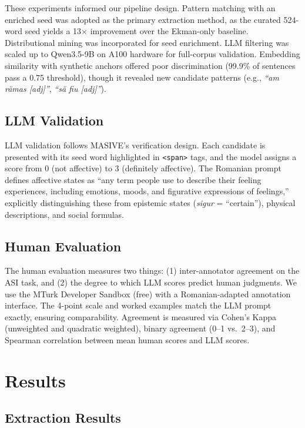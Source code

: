 \documentclass[11pt]{article}
\begin{document}
These experiments informed our pipeline design. Pattern matching with an enriched seed was adopted as the primary extraction method, as the curated 524-word seed yields a 13$\times$ improvement over the Ekman-only baseline. Distributional mining was incorporated for seed enrichment. LLM filtering was scaled up to Qwen3.5-9B on A100 hardware for full-corpus validation. Embedding similarity with synthetic anchors offered poor discrimination (99.9\% of sentences pass a 0.75 threshold), though it revealed new candidate patterns (e.g., \textit{``am r\u{a}mas [adj]''}, \textit{``s\u{a} fiu [adj]''}).

\subsection{LLM Validation}

LLM validation follows MASIVE's verification design. Each candidate is presented with its seed word highlighted in \texttt{<span>} tags, and the model assigns a score from 0 (not affective) to 3 (definitely affective). The Romanian prompt defines affective states as ``any term people use to describe their feeling experiences, including emotions, moods, and figurative expressions of feelings,'' explicitly distinguishing these from epistemic states (\textit{sigur} = ``certain''), physical descriptions, and social formulas.

\subsection{Human Evaluation}

The human evaluation measures two things: (1) inter-annotator agreement on the ASI task, and (2) the degree to which LLM scores predict human judgments. We use the MTurk Developer Sandbox (free) with a Romanian-adapted annotation interface. The 4-point scale and worked examples match the LLM prompt exactly, ensuring comparability. Agreement is measured via Cohen's Kappa (unweighted and quadratic weighted), binary agreement (0--1 vs.\ 2--3), and Spearman correlation between mean human scores and LLM scores.


\section{Results}

\subsection{Extraction Results}
\end{document}
